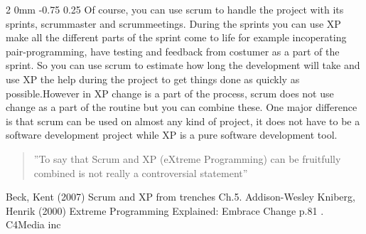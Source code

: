 \documentclass[a4paper,11pt]{article}
\makeatletter
\renewcommand{\subsection}{\@startsection
   {subsection}%
   {2}%
   {0mm}%
   {-0.75\baselineskip}%
   {0.25\baselineskip}%
   {\rmfamily\normalfont\slshape\normalsize}}%
\makeatother
\begin{document}
 \subsection{}
 Of course, you can use scrum to handle the project with its sprints, scrummaster and scrummeetings. During the sprints you can use XP make all the different parts of the sprint come to life for example incoperating pair-programming, have testing and feedback from costumer as a part of the sprint. So you can use scrum to estimate how long the development will take and use XP the help during the project to get things done as quickly as possible.However in XP change is a part of the process, scrum does not use change as a part of the routine but you can combine these. One major difference is that scrum can be used on almost any kind of project, it does not have to be a software development project while XP is a pure software development tool.\newline
 \begin{quote}''To say that Scrum and XP (eXtreme Programming) can be fruitfully
combined is not really a controversial statement''
 \end{quote}\cite{HENRIK}

\begin{thebibliography}{widest entry}

 Beck, Kent (2007) Scrum and XP from trenches Ch.5. Addison-Wesley
 Kniberg, Henrik (2000) Extreme Programming Explained: Embrace Change p.81 . C4Media inc
\end{thebibliography}
\end{document}
